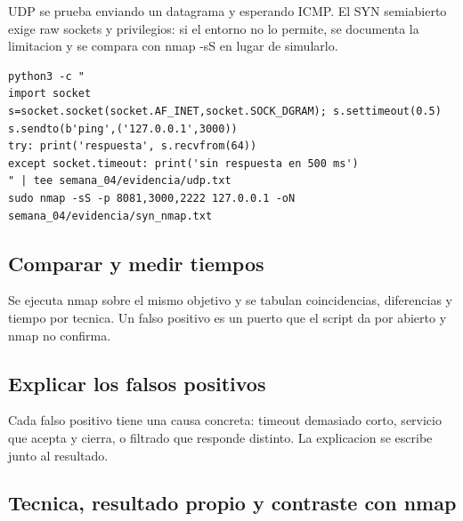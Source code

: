 \documentclass[11pt,a4paper]{article}
\begin{document}
UDP se prueba enviando un datagrama y esperando ICMP. El SYN semiabierto exige raw sockets y privilegios: si el entorno no lo permite, se documenta la limitacion y se compara con nmap -sS en lugar de simularlo.

\begin{lstlisting}[style=estiloCodigo]
python3 -c "
import socket
s=socket.socket(socket.AF_INET,socket.SOCK_DGRAM); s.settimeout(0.5)
s.sendto(b'ping',('127.0.0.1',3000))
try: print('respuesta', s.recvfrom(64))
except socket.timeout: print('sin respuesta en 500 ms')
" | tee semana_04/evidencia/udp.txt
sudo nmap -sS -p 8081,3000,2222 127.0.0.1 -oN semana_04/evidencia/syn_nmap.txt
\end{lstlisting}

\subsection{Comparar y medir tiempos}

Se ejecuta nmap sobre el mismo objetivo y se tabulan coincidencias, diferencias y tiempo por tecnica. Un falso positivo es un puerto que el script da por abierto y nmap no confirma.

\subsection{Explicar los falsos positivos}

Cada falso positivo tiene una causa concreta: timeout demasiado corto, servicio que acepta y cierra, o filtrado que responde distinto. La explicacion se escribe junto al resultado.

\subsection{Tecnica, resultado propio y contraste con nmap}
\end{document}
